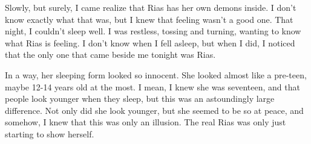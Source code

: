 \documentclass{article}
\begin{document}
Slowly, but surely, I came realize that Rias has her own demons inside. I don't know exactly what that was, but I knew that feeling wasn't a good one. That night, I couldn't sleep well. I was restless, tossing and turning, wanting to know what Rias is feeling. I don't know when I fell asleep, but when I did, I noticed that the only one that came beside me tonight was Rias.

In a way, her sleeping form looked so innocent. She looked almost like a pre-teen, maybe 12-14 years old at the most. I mean, I knew she was seventeen, and that people look younger when they sleep, but this was an astoundingly large difference. Not only did she look younger, but she seemed to be so at peace, and somehow, I knew that this was only an illusion. The real Rias was only just starting to show herself.
\end{document}
